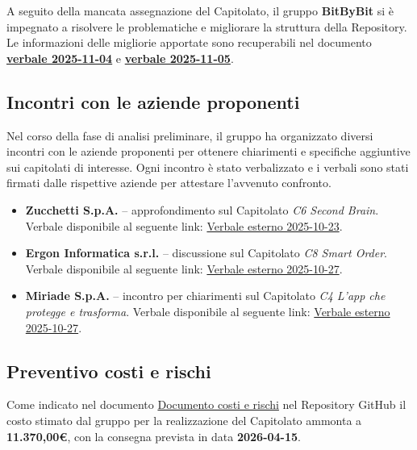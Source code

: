 \documentclass[a4paper,12pt]{article}
\begin{document}
A seguito della mancata assegnazione del Capitolato, il gruppo \textbf{BitByBit} si è impegnato a risolvere le problematiche e migliorare la struttura della Repository. Le informazioni delle migliorie apportate sono recuperabili nel documento \href{https://swe-bitbybit.github.io/SWE-project/docs/candidatura/verbali_interni/2025-11-04/verbale_2025-11-04.pdf}{\textbf{verbale 2025-11-04}} e \href{https://swe-bitbybit.github.io/SWE-project/docs/candidatura/verbali_interni/2025-11-05/verbale_2025-11-05.pdf}{\textbf{verbale 2025-11-05}}.

\subsection{Incontri con le aziende proponenti}

Nel corso della fase di analisi preliminare, il gruppo ha organizzato diversi incontri con le aziende proponenti per ottenere chiarimenti e specifiche aggiuntive sui capitolati di interesse.  
Ogni incontro è stato verbalizzato e i verbali sono stati firmati dalle rispettive aziende per attestare l’avvenuto confronto.

\begin{itemize}
    \item \textbf{Zucchetti S.p.A.} – approfondimento sul Capitolato \emph{C6 Second Brain}.  
    Verbale disponibile al seguente link: \href{https://swe-bitbybit.github.io/SWE-project/docs/candidatura/verbali_esterni/2025-10-23/verbale_esterno_C6_firmato.pdf}{Verbale esterno 2025-10-23}.
    \item \textbf{Ergon Informatica s.r.l.} – discussione sul Capitolato \emph{C8 Smart Order}.  
    Verbale disponibile al seguente link: \href{https://swe-bitbybit.github.io/SWE-project/docs/candidatura/verbali_esterni/2025-10-27_Incontro_C8/verbale_esterno_C8_firmato.pdf}{Verbale esterno 2025-10-27}.
    \item \textbf{Miriade S.p.A.} – incontro per chiarimenti sul Capitolato \emph{C4 L’app che protegge e trasforma}.  
    Verbale disponibile al seguente link: \href{https://swe-bitbybit.github.io/SWE-project/docs/candidatura/verbali_esterni/2025-10-27_Incontro_C4/verbale_esterno_C4_firmato.pdf}{Verbale esterno 2025-10-27}.
\end{itemize}

\subsection{Preventivo costi e rischi}
Come indicato nel documento \href{https://swe-bitbybit.github.io/SWE-project/docs/candidatura/valutazione_costi_rischi/valutazione_costi_rischi.pdf}{Documento costi e rischi} nel Repository GitHub il costo stimato dal gruppo per la realizzazione del Capitolato ammonta a \textbf{11.370,00€}, con la consegna prevista in data \textbf{2026-04-15}.
\end{document}
